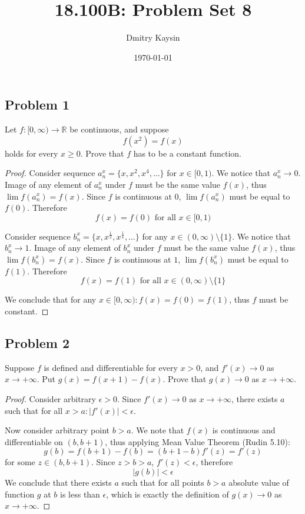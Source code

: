 \documentclass{article}
\title{18.100B: Problem Set 8}
\author{Dmitry Kaysin}
\date\today
\begin{document}
\maketitle 

\subsection*{Problem 1}

\begin{tcolorbox}
Let $f : [0, \infty) \to \mathbb{R}$ be continuous, and suppose
$$ f(x^2) = f(x) $$ 
holds for every $x \geq 0$. Prove that $f$ has to be a constant function.
\end{tcolorbox}
\begin{proof}
Consider sequence $a^x_n = \{ x, x^2, x^4, \dots \}$ for $x \in [0, 1)$. We notice that $a^x_n \to 0$. Image of any element of $a^x_n$ under $f$ must be the same value $f(x)$, thus $\lim f(a^x_n) = f(x)$. Since $f$ is continuous at $0$,  $\lim f(a^x_n)$ must be equal to $f(0)$. Therefore
$$ f(x) = f(0) \text{ for all } x \in [0, 1)$$

Consider sequence $b^x_n = \{ x, x^{\frac{1}{2}}, x^{\frac{1}{4}}, \dots \}$ for any $x \in (0, \infty) \setminus \{1\}$. We notice that $b^x_n \to 1$. Image of any element of $b^x_n$ under $f$ must be the same value $f(x)$, thus $\lim f(b^x_n) = f(x)$. Since $f$ is continuous at $1$,  $\lim f(b^x_n)$ must be equal to $f(1)$. Therefore
$$ f(x) = f(1) \text{ for all } x \in (0, \infty) \setminus \{1\}$$

We conclude that for any $x \in [0, \infty) : f(x) = f(0) = f(1)$, thus $f$ must be constant.

\end{proof}


\subsection*{Problem 2}

\begin{tcolorbox}
Suppose $f$ is defined and differentiable for every $x > 0$, and $f'(x) \to 0$ as $x \to + \infty$. Put $g(x) = f(x+1)-f(x)$. Prove that $g(x) \to 0$ as $x \to +\infty$.
\end{tcolorbox}
\begin{proof}
Consider arbitrary $\epsilon>0$. Since $f'(x) \to 0$ as $x\to +\infty$, there exists $a$ such that for all $x>a : | f'(x)| < \epsilon$.

Now consider arbitrary point $b > a$. We note that $f(x)$ is continuous and differentiable on $(b,b+1)$, thus applying Mean Value Theorem (Rudin 5.10):
$$ g(b) = f(b+1) - f(b) = (b+1-b) f'(z) = f'(z) $$
for some $z \in (b,b+1)$.
Since $z > b > a$, $f'(z) < \epsilon$, therefore
$$ | g(b) | < \epsilon $$
We conclude that there exists $a$ such that for all points $b>a$ absolute value of function $g$ at $b$ is less than $\epsilon$, which is exactly the definition of $g(x) \to 0$ as $x \to +\infty$.
\end{proof}
\end{document}
